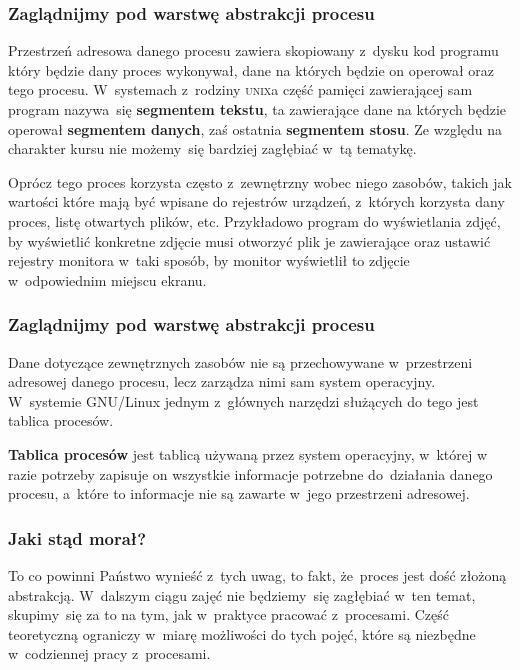 \documentclass[10pt,t]{beamer}
\begin{document}
\begin{frame}
  \frametitle{Zaglądnijmy pod warstwę abstrakcji procesu}


  Przestrzeń adresowa danego procesu zawiera skopiowany z~dysku kod programu
  który będzie dany proces wykonywał, dane na których będzie on operował
  oraz
  tego procesu. W~systemach z~rodziny \textsc{unix}a część pamięci
  zawierającej sam program nazywa~się \textbf{segmentem tekstu},
  ta zawierające dane na których będzie operował \textbf{segmentem danych},
  zaś ostatnia \textbf{segmentem stosu}. Ze względu na charakter kursu nie
  możemy~się bardziej zagłębiać w~tą tematykę.

  Oprócz tego proces korzysta często z~zewnętrzny wobec niego zasobów,
  takich jak wartości które mają być wpisane do rejestrów urządzeń,
  z~których korzysta dany proces, listę otwartych plików, etc. Przykładowo
  program do wyświetlania zdjęć, by wyświetlić konkretne zdjęcie musi
  otworzyć plik je zawierające oraz ustawić rejestry monitora w~taki
  sposób, by monitor wyświetlił to zdjęcie w~odpowiednim miejscu ekranu.

\end{frame}





\begin{frame}
  \frametitle{Zaglądnijmy pod warstwę abstrakcji procesu}


  Dane dotyczące zewnętrznych zasobów \alert{nie} są przechowywane
  w~przestrzeni adresowej danego procesu, lecz zarządza nimi sam system
  operacyjny. W~systemie GNU/Linux jednym z~głównych narzędzi
  służących do tego jest tablica procesów.

  \textbf{Tablica procesów} jest tablicą używaną przez system operacyjny,
  w~której w razie potrzeby zapisuje on wszystkie informacje potrzebne
  do~działania danego procesu, a~które to informacje nie są zawarte w~jego
  przestrzeni adresowej.



\end{frame}





\begin{frame}
  \frametitle{Jaki stąd morał?}


  To co powinni Państwo wynieść z~tych uwag, to fakt, że~proces jest dość
  złożoną abstrakcją. W~dalszym ciągu zajęć nie będziemy~się zagłębiać
  w~ten temat, skupimy~się za to na tym, jak w~praktyce pracować
  z~procesami. Część teoretyczną ograniczy w~miarę możliwości do tych
  pojęć, które są niezbędne w~codziennej pracy z~procesami.

\end{frame}
\end{document}
